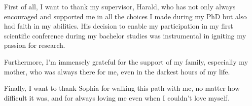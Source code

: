 First of all, I want to thank my supervisor, Harald, who has not only always encouraged and supported me in all the choices I made during my PhD but also had faith in my abilities. His decision to enable my participation in my first scientific conference during my bachelor studies was instrumental in igniting my passion for research.


Furthermore, I'm immensely grateful for the support of my family, especially my mother, who was always there for me, even in the darkest hours of my life.

Finally, I want to thank Sophia for walking this path with me, no matter how difficult it was, and for always loving me even when I couldn't love myself.
